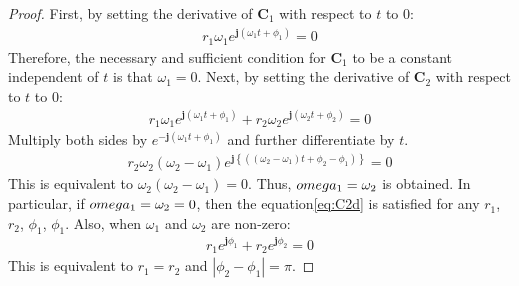 \documentclass[graybox, envcountchap]{svmult}
\begin{document}
\begin{proof}
First, by setting the derivative of $\bm{C}_1$ with respect to $t$ to 0:
\begin{align*}
r_1 \omega_1 e^{ \bm{j} (\omega_1 t + \phi_1)}=0
\end{align*}
Therefore, the necessary and sufficient condition for $\bm{C}_1$ to be a constant independent of $t$ is that $\omega_1=0$.
Next, by setting the derivative of $\bm{C}_2$ with respect to $t$ to 0:
\begin{align}\label{eq:C2d}
r_1 \omega_1 e^{ \bm{j} (\omega_1 t + \phi_1)}
+ r_2 \omega_2 e^{ \bm{j} (\omega_2 t + \phi_2)}=0
\end{align}
Multiply both sides by $e^{ -\bm{j} (\omega_1 t + \phi_1)}$ and further differentiate by $t$.
\begin{align*}
r_2 \omega_2 (\omega_2-\omega_1)
e^{ \bm{j} \left\{( 
(\omega_2-\omega_1) t + \phi_2 - \phi_1)
\right\}
}=0
\end{align*}
This is equivalent to $\omega_2 (\omega_2-\omega_1)=0$.
Thus, $\\omega_1 =\omega_2$ is obtained.
In particular, if $\\omega_1=\omega_2=0$, then the equation\ref{eq:C2d} is satisfied for any $r_1$, $r_2$, $\phi_1$, $\phi_1$.
Also, when $\omega_1$ and $\omega_2$ are non-zero:
\begin{align*}
r_1 e^{ \bm{j} \phi_1} + r_2 e^{ \bm{j} \phi_2} =0
\end{align*}
This is equivalent to $r_1=r_2$ and $|\phi_2-\phi_1| = \pi$.


\end{proof}
\end{document}
